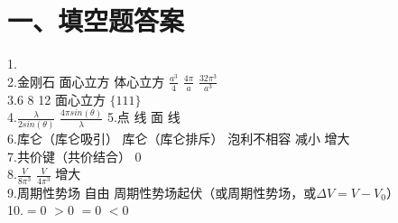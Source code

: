 \documentclass[UTF8]{ctexart}
\begin{document}
\section*{\bfseries 一、填空题答案}
1.\\
2.金刚石\mbox{\hspace{2em}}
面心立方\mbox{\hspace{2em}}
体心立方\mbox{\hspace{2em}}
$\frac{a^3}{4}$\mbox{\hspace{2em}}
$\frac{4\pi}{a}$\mbox{\hspace{2em}}
$\frac{32\pi^3}{a^3}$\\
3.6\mbox{\hspace{2em}}
8\mbox{\hspace{2em}}
12\mbox{\hspace{2em}}
面心立方\mbox{\hspace{2em}}
$\{111\}$\\
4.$\frac{\lambda}{2sin(\theta)}$\mbox{\hspace{2em}}
$\frac{4\pi sin(\theta)}{\lambda}$\mbox{\hspace{2em}}
5.点\mbox{\hspace{2em}}
线\mbox{\hspace{2em}}
面\mbox{\hspace{2em}}
线\\
6.库仑（库仑吸引）\mbox{\hspace{2em}}
库仑（库仑排斥）\mbox{\hspace{2em}}
泡利不相容\mbox{\hspace{2em}}
减小\mbox{\hspace{2em}}
增大\\
7.共价键（共价结合）\mbox{\hspace{2em}}
0\\
8.$\frac{V}{8\pi^3}$\mbox{\hspace{2em}}
$\frac{V}{4\pi^3}$\mbox{\hspace{2em}}
增大\\
9.周期性势场\mbox{\hspace{2em}}
自由\mbox{\hspace{2em}}
周期性势场起伏（或周期性势场，或$\Delta V=V-V_0$）\\
10.$=0$\mbox{\hspace{2em}}
$>0$\mbox{\hspace{2em}}
$=0$\mbox{\hspace{2em}}
$<0$\\
\end{document}
